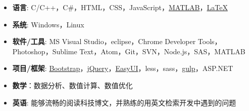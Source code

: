   \begin{itemize}[leftmargin=*]
    \item \textbf{语言}: C/C++，C\#，HTML，CSS，JavaScript，\href{http://cn.mathworks.com/products/matlab/}{MATLAB}，\href{http://www.latex-project.org/}{\LaTeX}
    \item \textbf{系统}: Windows，Linux
    \item \textbf{软件/工具}: MS Visual Studio，eclipse，Chrome Developer Tools，Photoshop，Sublime Text，Atom，Git，SVN，Node.js，SAS，MATLAB
    \item \textbf{项目/框架}: \href{http://www.bootcss.com/}{Bootstrap}，\href{https://jquery.com/}{jQuery}，\href{http://jeasyui.com/}{EasyUI}，less，sass，\href{http://gulpjs.com/}{gulp}，ASP.NET
    \item \textbf{数学}：数据分析、数值计算、数值优化
    \item \textbf{英语}: 能够流畅的阅读科技博文，并熟练的用英文检索开发中遇到的问题
  \end{itemize}